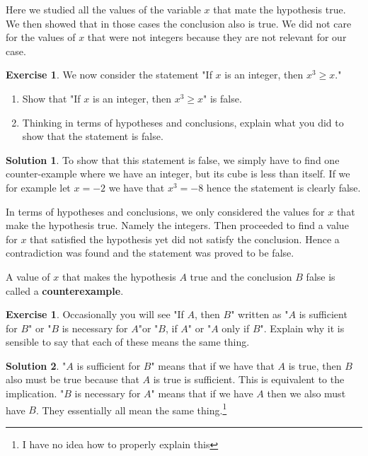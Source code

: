 \documentclass[a4paper, 11pt]{report}
\theoremstyle{plain}
\theoremstyle{definition}
\newtheorem{exrc}[thm]{Exercise}
\newtheorem*{sltn}{Solution}
\begin{document}
Here we studied all the values of the variable $x$ that mate the hypothesis
true. We then showed that in those cases the conclusion also is true. We did
not care for the values of $x$ that were not integers because they are not relevant for our case.

\begin{exrc}
  We now consider the statement "If $x$ is an integer, then $x^3 \geq x$."
  \begin{enumerate}
    \item Show that "If $x$ is an integer, then $x^3 \geq x$" is false.  \item
      Thinking in terms of hypotheses and conclusions, explain what you did to
      show that the statement is false.
  \end{enumerate}
\end{exrc}

\begin{sltn}
To show that this statement is false, we simply have to find one
counter-example where we have an integer, but its cube is less than itself.  If
we for example let $x = -2$ we have that $x^3 = -8$ hence the statement is
clearly false.

In terms of hypotheses and conclusions, we only considered the values for $x$
that make the hypothesis true. Namely the integers. Then proceeded to find a
value for $x$ that satisfied the hypothesis yet did not satisfy the conclusion.
Hence a contradiction was found and the statement was proved to be false.
\end{sltn}

A value of $x$ that makes the hypothesis $A$ true and the conclusion $B$ false
is called a \textbf{counterexample}.

\begin{exrc}
  Occasionally you will see "If $A$, then $B$" written as "$A$ is sufficient
  for $B$" or "$B$ is necessary for $A$"or "$B$, if $A$" or "$A$ only if $B$".
  Explain why it is sensible to say that each of these means the same thing.
\end{exrc}
\begin{sltn}
"$A$ is sufficient for $B$" means that if we have that $A$ is true, then $B$
also must be true because that $A$ is true is sufficient. This is equivalent to
the implication. "$B$ is necessary for $A$" means that if we have $A$ then we
also must have $B$. They essentially all mean the same thing.\footnote{I have
no idea how to properly explain this}
\end{sltn}
\end{document}
